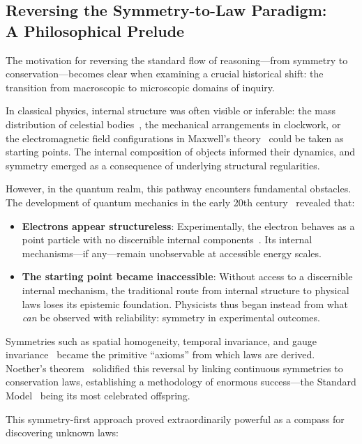 \documentclass[%
 reprint,
 amsmath,amssymb,
 aps,
]{revtex4-1}
\numberwithin{equation}{section}%
\begin{document}
\subsection{Reversing the Symmetry-to-Law Paradigm:\\ A Philosophical Prelude}

The motivation for reversing the standard flow of reasoning---from symmetry to conservation---becomes clear when examining a crucial historical shift: the transition from macroscopic to microscopic domains of inquiry.

In classical physics, internal structure was often visible or inferable: the mass distribution of celestial bodies~\cite{newton1687}, the mechanical arrangements in clockwork, or the electromagnetic field configurations in Maxwell's theory~\cite{maxwell1873} could be taken as starting points. The internal composition of objects informed their dynamics, and symmetry emerged as a consequence of underlying structural regularities.

However, in the quantum realm, this pathway encounters fundamental obstacles. The development of quantum mechanics in the early 20th century~\cite{heisenberg1925,schrodinger1926} revealed that:

\begin{itemize}
  \item \textbf{Electrons appear structureless}: Experimentally, the electron behaves as a point particle with no discernible internal components~\cite{dehmelt1988}. Its internal mechanisms---if any---remain unobservable at accessible energy scales.
  \item \textbf{The starting point became inaccessible}: Without access to a discernible internal mechanism, the traditional route from internal structure to physical laws loses its epistemic foundation. Physicists thus began instead from what \emph{can} be observed with reliability: symmetry in experimental outcomes.
\end{itemize}

Symmetries such as spatial homogeneity, temporal invariance, and gauge invariance~\cite{yang1954} became the primitive ``axioms'' from which laws are derived. Noether's theorem~\cite{noether1918} solidified this reversal by linking continuous symmetries to conservation laws, establishing a methodology of enormous success---the Standard Model~\cite{glashow1961,weinberg1967,salam1968} being its most celebrated offspring.

This symmetry-first approach proved extraordinarily powerful as a compass for discovering unknown laws:
\end{document}
